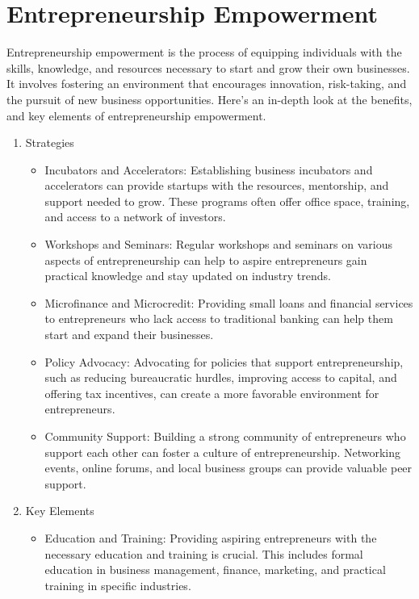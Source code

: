 \section{Entrepreneurship Empowerment}
Entrepreneurship empowerment is the process of equipping individuals with the skills, knowledge, and resources necessary to start and grow their own businesses. It involves fostering an environment that encourages innovation, risk-taking, and the pursuit of new business opportunities. Here's an in-depth look at the benefits, and key elements of entrepreneurship empowerment.

\begin{enumerate}
    \item Strategies
    \begin{itemize}
        \item Incubators and Accelerators: Establishing business incubators and accelerators can provide startups with the resources, mentorship, and support needed to grow. These programs often offer office space, training, and access to a network of investors.

        \item Workshops and Seminars: Regular workshops and seminars on various aspects of entrepreneurship can help to aspire entrepreneurs gain practical knowledge and stay updated on industry trends.

        \item Microfinance and Microcredit: Providing small loans and financial services to entrepreneurs who lack access to traditional banking can help them start and expand their businesses.

        \item Policy Advocacy: Advocating for policies that support entrepreneurship, such as reducing bureaucratic hurdles, improving access to capital, and offering tax incentives, can create a more favorable environment for entrepreneurs.

        \item Community Support: Building a strong community of entrepreneurs who support each other can foster a culture of entrepreneurship. Networking events, online forums, and local business groups can provide valuable peer support.
    \end{itemize}
    \item Key Elements
    \begin{itemize}
        \item Education and Training: Providing aspiring entrepreneurs with the necessary education and training is crucial. This includes formal education in business management, finance, marketing, and practical training in specific industries.


\end{itemize}
\end{enumerate}
